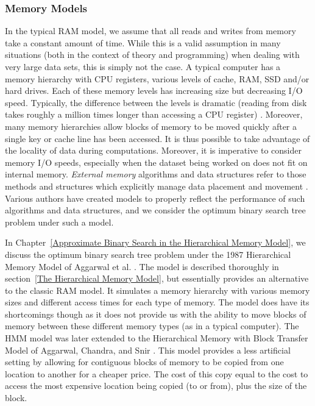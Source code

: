 \documentclass[]{beamer}
\theoremstyle{plain}
\begin{document}
\begin{frame} \frametitle{Memory Models}

In the typical RAM model, we assume that all reads and writes from memory take a constant amount of time. While this is a valid assumption in many situations (both in the context of theory and programming) when dealing with very large data sets, this is simply not the case. A typical computer has a memory hierarchy with CPU registers, various levels of cache, RAM, SSD and/or hard drives. Each of these memory levels has increasing size but decreasing I/O speed. Typically, the difference between the levels is dramatic (reading from disk takes roughly a million times longer than accessing a CPU register) \cite{vitter2001external}. Moreover, many memory hierarchies allow blocks of memory to be moved quickly after a single key or cache line has been accessed. It is thus possible to take advantage of the locality of data during computations. Moreover, it is imperative to consider memory I/O speeds, especially when the dataset being worked on does not fit on internal memory. \textit{External memory} algorithms and data structures refer to those methods and structures which explicitly manage data placement and movement \cite{vitter2001external}. Various authors have created models to properly reflect the performance of such algorithms and data structures, and we consider the optimum binary search tree problem under such a model.

In Chapter~\ref{Approximate Binary Search in the Hierarchical Memory Model}, we discuss the optimum binary search tree problem under the 1987 Hierarchical Memory Model of Aggarwal et al. \cite{aggarwal1987model}. The model is described thoroughly in section~\ref{The Hierarchical Memory Model}, but essentially provides an alternative to the classic RAM model. It simulates a memory hierarchy with various memory sizes and different access times for each type of memory. The model does have its shortcomings though as it does not provide us with the ability to move blocks of memory between these different memory types (as in a typical computer). The HMM model was later extended to the Hierarchical Memory with Block Transfer Model of Aggarwal, Chandra, and Snir \cite{aggarwal1987hierarchical}. This model provides a less artificial setting by allowing for contiguous blocks of memory to be copied from one location to another for a cheaper price. The cost of this copy equal to the cost to access the most expensive location being copied (to or from), plus the size of the block.


\end{frame}
\end{document}
